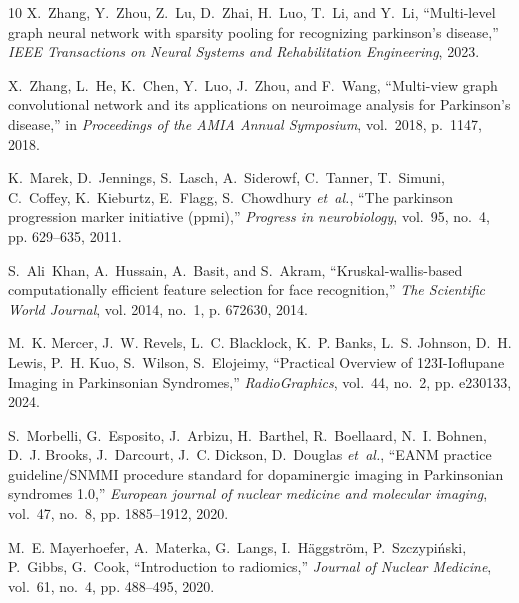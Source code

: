 \documentclass[twocolumn]{article}
\begin{document}
\begin{thebibliography}{10}
X.~Zhang, Y.~Zhou, Z.~Lu, D.~Zhai, H.~Luo, T.~Li, and Y.~Li, ``Multi-level
  graph neural network with sparsity pooling for recognizing parkinson’s
  disease,'' \emph{IEEE Transactions on Neural Systems and Rehabilitation
  Engineering}, 2023.

X.~Zhang, L.~He, K.~Chen, Y.~Luo, J.~Zhou, and F.~Wang,
``Multi-view graph convolutional network and its applications on neuroimage analysis for Parkinson’s disease,''
in \emph{Proceedings of the AMIA Annual Symposium}, vol.~2018, p.~1147, 2018.

K.~Marek, D.~Jennings, S.~Lasch, A.~Siderowf, C.~Tanner, T.~Simuni, C.~Coffey,
  K.~Kieburtz, E.~Flagg, S.~Chowdhury \emph{et~al.}, ``The parkinson
  progression marker initiative (ppmi),'' \emph{Progress in neurobiology},
  vol.~95, no.~4, pp. 629--635, 2011.

S.~Ali~Khan, A.~Hussain, A.~Basit, and S.~Akram, ``Kruskal-wallis-based
  computationally efficient feature selection for face recognition,'' \emph{The
  Scientific World Journal}, vol. 2014, no.~1, p. 672630, 2014.

M.~K. Mercer, J.~W. Revels, L.~C. Blacklock, K.~P. Banks, L.~S. Johnson, D.~H. Lewis, P.~H. Kuo, S.~Wilson, S.~Elojeimy, ``Practical Overview of 123I-Ioflupane Imaging in Parkinsonian Syndromes,'' \emph{RadioGraphics}, vol.~44, no.~2, pp. e230133, 2024.

S.~Morbelli, G.~Esposito, J.~Arbizu, H.~Barthel, R.~Boellaard, N.~I. Bohnen, D.~J. Brooks, J.~Darcourt, J.~C. Dickson, D.~Douglas \emph{et~al.}, ``EANM practice guideline/SNMMI procedure standard for dopaminergic imaging in Parkinsonian syndromes 1.0,'' \emph{European journal of nuclear medicine and molecular imaging}, vol.~47, no.~8, pp. 1885--1912, 2020.

M.~E. Mayerhoefer, A.~Materka, G.~Langs, I.~H{\"a}ggstr{\"o}m, P.~Szczypi{\'n}ski, P.~Gibbs, G.~Cook, ``Introduction to radiomics,'' \emph{Journal of Nuclear Medicine}, vol.~61, no.~4, pp. 488--495, 2020.

\end{thebibliography}
\end{document}
